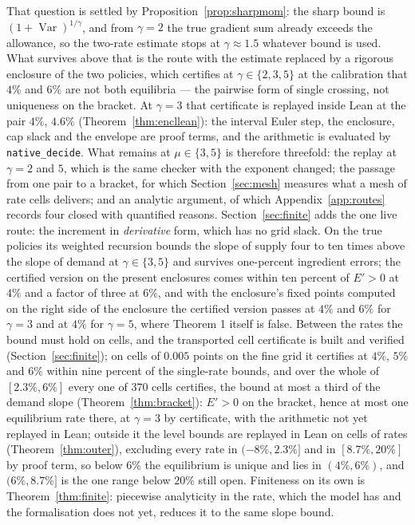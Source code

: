 That question is settled by Proposition~\ref{prop:sharpmom}: the sharp bound is
$(1+\operatorname{Var})^{1/\gamma}$, and from $\gamma=2$ the true gradient sum already exceeds the
allowance, so the two-rate estimate stops at $\gamma\approx1.5$ whatever bound is used. What
survives above that is the route with the estimate replaced by a rigorous enclosure of the two
policies, which certifies at $\gamma\in\{2,3,5\}$ at the calibration that $4\%$ and $6\%$ are not
both equilibria --- the pairwise form of single crossing, not uniqueness on the bracket. At
$\gamma=3$ that certificate is replayed inside Lean at the pair $4\%$, $4.6\%$
(Theorem~\ref{thm:encllean}): the interval Euler step, the enclosure, cap slack and the envelope
are proof terms, and the arithmetic is evaluated by \texttt{native\_decide}. What remains at
$\mu\in\{3,5\}$ is therefore threefold: the replay at $\gamma=2$ and $5$, which is the same
checker with the exponent changed; the passage from one pair to a bracket, for which
Section~\ref{sec:mesh} measures what a mesh of rate cells delivers; and an analytic argument, of
which Appendix~\ref{app:routes} records four closed with quantified reasons. Section~\ref{sec:finite}
adds the one live route: the increment in \emph{derivative} form, which has no grid slack. On the
true policies its weighted recursion bounds the slope of supply four to ten times above the slope
of demand at $\gamma\in\{3,5\}$ and survives one-percent ingredient errors; the certified version
on the present enclosures comes within ten percent of $E'>0$ at $4\%$ and a factor of three at $6\%$,
and with the enclosure's fixed points computed on the right side of the enclosure the certified version
passes at $4\%$ and $6\%$ for $\gamma=3$ and at $4\%$ for $\gamma=5$, where Theorem 1 itself is
false. Between the rates the bound must hold on cells, and the transported cell certificate is built
and verified (Section~\ref{sec:finite}); on cells of $0.005$ points on the fine grid it certifies at $4\%$, $5\%$
and $6\%$ within nine percent of the single-rate bounds, and over the whole of $[2.3\%,6\%]$ every
one of $370$ cells certifies, the bound at most a third of the demand slope
(Theorem~\ref{thm:bracket}): $E'>0$ on the bracket, hence at most one equilibrium rate there, at
$\gamma=3$ by certificate, with the arithmetic not yet replayed in Lean; outside it the level bounds
are replayed in Lean on cells of rates (Theorem~\ref{thm:outer}), excluding every rate in
$(-8\%,2.3\%]$ and in $[8.7\%,20\%]$ by proof term, so below $6\%$ the equilibrium is unique and
lies in $(4\%,6\%)$, and $(6\%,8.7\%]$ is the one range below $20\%$ still open. Finiteness on its own is Theorem~\ref{thm:finite}: piecewise analyticity
in the rate, which the model has and the formalisation does not yet, reduces it to the same slope
bound.

